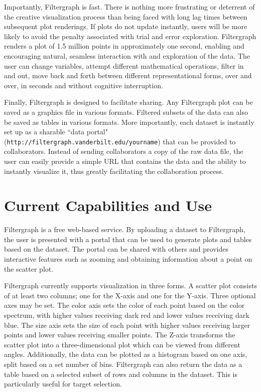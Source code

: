 Importantly, Filtergraph is fast. There is nothing more frustrating or deterrent of the creative visualization process than being faced with long lag times between subsequent plot renderings. If plots do not update instantly, users will be more likely to avoid the penalty associated with trial and error exploration. Filtergraph renders a plot of 1.5 million points in approximately one second, enabling and encouraging natural, seamless interaction with and exploration of the data. The user can change variables, attempt different mathematical operations, filter in and out, move back and forth between different representational forms, over and over, in seconds and without cognitive interruption.

Finally, Filtergraph is designed to facilitate sharing. Any Filtergraph plot can be saved as a graphics file in various formats. Filtered subsets of the data can also be saved as tables in various formats. More importantly, each dataset is instantly set up as a sharable ``data portal" ({\tt http://filtergraph.vanderbilt.edu/yourname}) that can be provided to collaborators. Instead of sending collaborators a copy of the raw data file, the user can easily provide a simple URL that contains the data and the ability to instantly visualize it, thus greatly facilitating the collaboration process.

\section{Current Capabilities and Use}
Filtergraph is a free web-based service. By uploading a dataset to Filtergraph, the user is presented with a portal that can be used to generate plots and tables based on the dataset. The portal can be shared with others and provides interactive features such as zooming and obtaining information about a point on the scatter plot.

Filtergraph currently supports visualization in three forms. A scatter plot consists of at least two columns; one for the X-axis and one for the Y-axis. Three optional axes may be set. The color axis sets the color of each point based on the color spectrum, with higher values receiving dark red and lower values receiving dark blue. The size axis sets the size of each point with higher values receiving larger points and lower values receiving smaller points. The Z-axis transforms the scatter plot into a three-dimensional plot which can be viewed from different angles. Additionally, the data can be plotted as a histogram based on one axis, split based on a set number of bins. Filtergraph can also return the data as a table based on a selected subset of rows and columns in the dataset. This is particularly useful for target selection.

